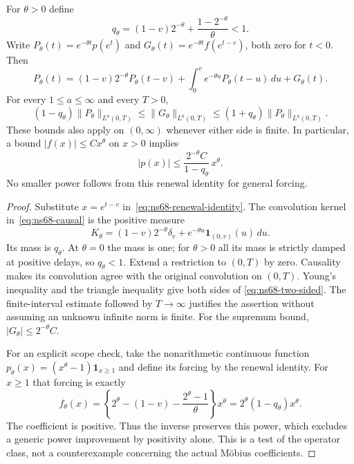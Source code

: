 \begin{proposition}
\label{prop:ns68-weighted-inversion}
For $\theta>0$ define
\[
 q_\theta=(1-v)2^{-\theta}+\frac{1-2^{-\theta}}\theta<1.
\]
Write $P_\theta(t)=e^{-\theta t}p(e^t)$ and
$G_\theta(t)=e^{-\theta t}f(e^{t-v})$, both zero for $t<0$.
Then
\begin{equation}
 P_\theta(t)=(1-v)2^{-\theta}P_\theta(t-v)
       +\int_0^v e^{-\theta u}P_\theta(t-u)\,du+G_\theta(t).
 \label{eq:ns68-causal}
\end{equation}
For every $1\leq a\leq\infty$ and every $T>0$,
\begin{equation}
 (1-q_\theta)\|P_\theta\|_{L^a(0,T)}
 \leq\|G_\theta\|_{L^a(0,T)}
 \leq(1+q_\theta)\|P_\theta\|_{L^a(0,T)}.
 \label{eq:ns68-two-sided}
\end{equation}
These bounds also apply on $(0,\infty)$ whenever either side is
finite. In particular, a bound $|f(x)|\leq Cx^\theta$ on $x>0$
implies
\begin{equation}
 |p(x)|\leq\frac{2^{-\theta}C}{1-q_\theta}\,x^\theta.
 \label{eq:ns68-sup-transfer}
\end{equation}
No smaller power follows from this renewal identity for general forcing.
\end{proposition}
\begin{proof}
Substitute $x=e^{t-v}$ in~\eqref{eq:ns68-renewal-identity}. The
convolution kernel in~\eqref{eq:ns68-causal} is the positive measure
\[
 K_\theta=(1-v)2^{-\theta}\delta_v
              +e^{-\theta u}\mathbf1_{(0,v)}(u)\,du.
\]
Its mass is $q_\theta$. At $\theta=0$ the mass is one; for
$\theta>0$ all its mass is strictly damped at positive delays, so
$q_\theta<1$. Extend a restriction to $(0,T)$ by zero. Causality
makes its convolution agree with the original convolution on $(0,T)$.
Young's inequality and the triangle inequality give both sides of
\eqref{eq:ns68-two-sided}. The finite-interval estimate followed by
$T\to\infty$ justifies the assertion without assuming an unknown
infinite norm is finite. For the supremum bound,
$|G_\theta|\leq2^{-\theta}C$.

For an explicit scope check, take the nonarithmetic continuous function
$p_\theta(x)=(x^\theta-1)\mathbf1_{x\geq1}$ and define its forcing
by the renewal identity. For $x\geq1$ that forcing is exactly
\[
 f_\theta(x)=\left\{2^\theta-(1-v)
                  -\frac{2^\theta-1}{\theta}\right\}x^\theta
            =2^\theta(1-q_\theta)x^\theta.
\]
The coefficient is positive. Thus the inverse preserves this power,
which excludes a generic power improvement by positivity alone. This
is a test of the operator class, not a counterexample concerning the
actual M\"obius coefficients.
\end{proof}

